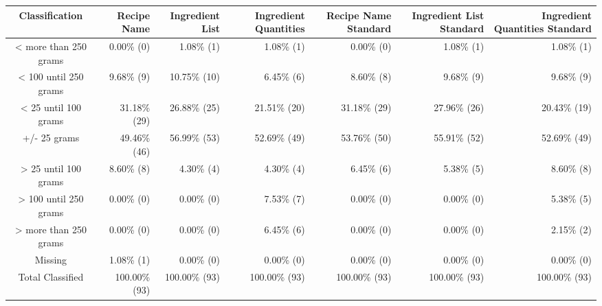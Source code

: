 \begin{table}[t]
\fontsize{12.0pt}{14.4pt}\selectfont
\begin{tabular*}{\linewidth}{@{\extracolsep{\fill}}crrrrrr}
\toprule
Classification & Recipe Name & Ingredient List & Ingredient Quantities & Recipe Name Standard & Ingredient List Standard & Ingredient Quantities Standard \\ 
\midrule\addlinespace[2.5pt]
< more than 250 grams & 0.00\%  (0) & 1.08\%  (1) & 1.08\%  (1) & 0.00\%  (0) & 1.08\%  (1) & 1.08\%  (1) \\ 
< 100 until 250 grams & 9.68\%  (9) & 10.75\% (10) & 6.45\%  (6) & 8.60\%  (8) & 9.68\%  (9) & 9.68\%  (9) \\ 
< 25 until 100 grams & 31.18\% (29) & 26.88\% (25) & 21.51\% (20) & 31.18\% (29) & 27.96\% (26) & 20.43\% (19) \\ 
+/- 25 grams & 49.46\% (46) & 56.99\% (53) & 52.69\% (49) & 53.76\% (50) & 55.91\% (52) & 52.69\% (49) \\ 
> 25 until 100 grams & 8.60\%  (8) & 4.30\%  (4) & 4.30\%  (4) & 6.45\%  (6) & 5.38\%  (5) & 8.60\%  (8) \\ 
> 100 until 250 grams & 0.00\%  (0) & 0.00\%  (0) & 7.53\%  (7) & 0.00\%  (0) & 0.00\%  (0) & 5.38\%  (5) \\ 
> more than 250 grams & 0.00\%  (0) & 0.00\%  (0) & 6.45\%  (6) & 0.00\%  (0) & 0.00\%  (0) & 2.15\%  (2) \\ 
Missing & 1.08\%  (1) & 0.00\%  (0) & 0.00\%  (0) & 0.00\%  (0) & 0.00\%  (0) & 0.00\%  (0) \\ 
Total Classified & 100.00\% (93) & 100.00\% (93) & 100.00\% (93) & 100.00\% (93) & 100.00\% (93) & 100.00\% (93) \\ 
\bottomrule
\end{tabular*}
\end{table}


